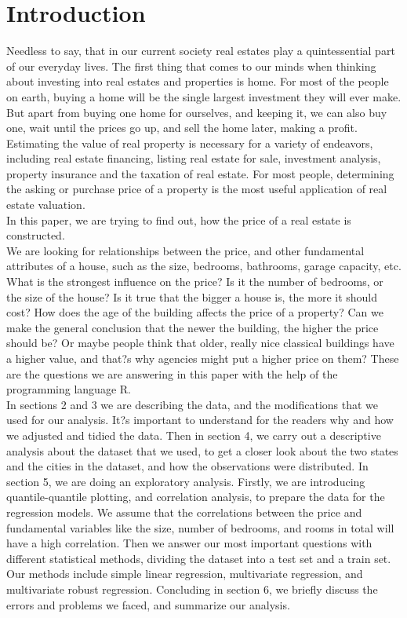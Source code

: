 
\section{Introduction}




Needless to say, that in our current society real estates play a quintessential part of our everyday lives. The first thing that comes to our minds when thinking about investing into real estates and properties is home. For most of the people on earth, buying a home will be the single largest investment they will ever make. But apart from buying one home for ourselves, and keeping it, we can also buy one, wait until the prices go up, and sell the home later, making a profit.\\
Estimating the value of real property is necessary for a variety of endeavors, including real estate financing, listing real estate for sale, investment analysis, property insurance and the taxation of real estate. For most people, determining the asking or purchase price of a property is the most useful application of real estate valuation.\\
In this paper, we are trying to find out, how the price of a real estate is constructed.\\
We are looking for relationships between the price, and other fundamental attributes of a house, such as the size, bedrooms, bathrooms, garage capacity, etc. What is the strongest influence on the price? Is it the number of bedrooms, or the size of the house? Is it true that the bigger a house is, the more it should cost? How does the age of the building affects the price of a property? Can we make the general conclusion that the newer the building, the higher the price should be? Or maybe people think that older, really nice classical buildings have a higher value, and that?s why agencies might put a higher price on them?  These are the questions we are answering in this paper with the help of the programming language R.\\

In sections 2 and 3 we are describing the data, and the modifications that we used for our analysis. It?s important to understand for the readers why and how we adjusted and tidied the data. Then in section 4, we carry out a descriptive analysis about the dataset that we used, to get a closer look about the two states and the cities in the dataset, and how the observations were distributed. In section 5, we are doing an exploratory analysis. Firstly, we are introducing quantile-quantile plotting, and correlation analysis, to prepare the data for the regression models. We assume that the correlations between the price and fundamental variables like the size, number of bedrooms, and rooms in total will have a high correlation. Then we answer our most important questions with different statistical methods, dividing the dataset into a test set and a train set. Our methods include simple linear regression, multivariate regression, and multivariate robust regression. Concluding in section 6, we briefly discuss the errors and problems we faced, and summarize our analysis.\\
